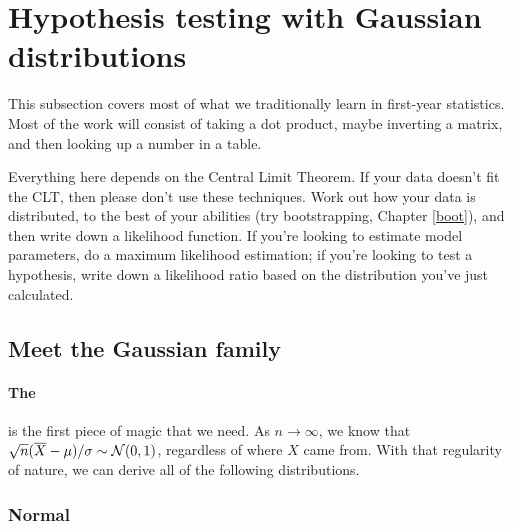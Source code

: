 \def\xv{{\bf x} } \def\yv{{\bf y} } \def\pv{{\bf p} }
\def\Iv{{\bf I}}\def\Sv{{\bf S}}\def\yv{{\bf y}}\def\Zv{{\bf Z}} \def\cv{{\bf c}} \def\uv{{\bf u}} \def\Yv{{\bf Y}} \def\Xv{{\bf X}} \def\Qv{{\bf Q}}
\def\betav{{\mbox{\boldmath$\beta$}}}
\def\vector#1{\left[\matrix{#1}\right]}
\chapter[Gaussian tricks]{Hypothesis testing with Gaussian distributions} \label{gauss}

This subsection covers most of what we traditionally learn in first-year statistics. 
 Most of the work will consist of taking a dot product, maybe inverting a matrix,
and then looking up a number in a table. 

Everything here depends on the Central Limit Theorem. If your data doesn't fit the CLT, then please don't use
these techniques. Work out how your data is distributed, to the best of your abilities
(try bootstrapping, Chapter \ref{boot}), and then write down a likelihood function. If you're looking to
estimate model parameters, do a maximum likelihood estimation; if you're looking to test a hypothesis,
write down a likelihood ratio based on the distribution you've just calculated.

\section{Meet the Gaussian family}

\subsubsection{The } is the first piece of magic
that we need. As $n\to \infty$, we know that $\sqrt{n} (\overline X -
\mu)/\sigma \sim {\cal N}(0,1)$, regardless of where $X$ came
from. With that regularity of nature, we can derive all of the following distributions.
\label{CLT}

\subsection{Normal} 

